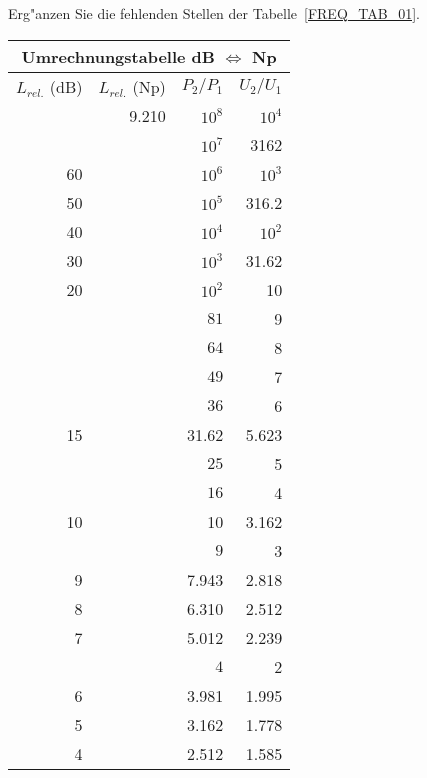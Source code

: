 {\newpage
\vspace*{-9mm}\aufg
Erg"anzen Sie die fehlenden Stellen der Tabelle~\ref{FREQ_TAB_01}. \\
\begin{table}[htb!]
\vspace*{-4mm}\begin{center}
{\footnotesize \begin{tabular}{|r|r|r|r|} \hline
\multicolumn{4}{|c|}{\bf Umrechnungstabelle dB $\Leftrightarrow$ Np} \\ \hline\hline
$L_{rel.}$ (dB) & $L_{rel.}$ (Np)  & $P_2/P_1$ & $U_2/U_1$ \\ \hline
 \hspace*{3cm} &   9.210  & $10^8$   & $10^4$       \\ \hline
 \hspace*{3cm} &          & $10^7$   & 3162 \\ \hline
  60 &          & $10^6$   & $10^3$\\ \hline
  50 &          & $10^5$   & 316.2\\ \hline
  40 &          & $10^4$   & $10^2$\\ \hline
  30 &          & $10^3$   & 31.62\\ \hline
  20 &          & $10^2$   & 10\\ \hline
      &          & $81$   & 9\\ \hline
      &          & $64$   & 8\\ \hline
      &          & $49$   & 7\\ \hline
      &          & $36$   & 6\\ \hline
  15 &          & 31.62    & 5.623\\ \hline
      &          & $25$   & 5\\ \hline
      &          & $16$   & 4\\ \hline
  10 &          & 10       & 3.162\\ \hline
      &          & $9$   & 3\\ \hline
   9 &          & 7.943    & 2.818\\ \hline
   8 &          & 6.310    & 2.512\\ \hline
   7 &          & 5.012    & 2.239\\ \hline
      &          & $4$   & 2\\ \hline
   6 &          & 3.981    & 1.995\\ \hline
   5 &          & 3.162    & 1.778\\ \hline
   4 &          & 2.512    & 1.585\\ \hline

\end{tabular}}
\end{center}
\end{table}}
